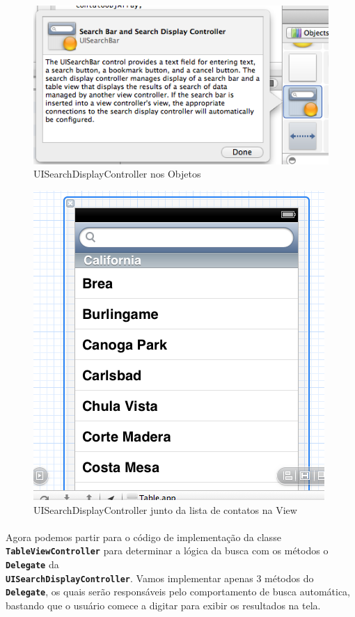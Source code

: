 \documentclass[a4paper,12pt,brazil,doubleside]{book}
\begin{document}
\begin{figure}[h]
  \centering
  \includegraphics[totalheight=0.2\textheight]{figuras/table/table2.png}
  \caption{UISearchDisplayController nos Objetos}
  \label{fig:a}
\end{figure}

\begin{figure}[h]
  \centering
  \includegraphics[totalheight=0.35\textheight]{figuras/table/table1.png}
  \caption{UISearchDisplayController junto da lista de contatos na View}
  \label{fig:a}
\end{figure}

\pagebreak

\paragraph{}Agora podemos partir para o código de implementação da classe \texttt{\textbf{TableViewController}} para determinar a lógica da busca com os métodos o \texttt{\textbf{Delegate}} da\\
\texttt{\textbf{UISearchDisplayController}}. Vamos implementar apenas 3 métodos do \texttt{\textbf{Delegate}}, os quais serão responsáveis pelo comportamento de busca automática, bastando que o usuário comece a digitar para exibir os resultados na tela.
\end{document}
